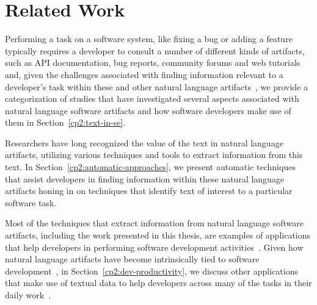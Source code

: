 \setcounter{chapter}{1}


\chapter{Related Work}
\label{ch:related-work}








Performing a task on a software system, like fixing a bug
or adding a feature typically requires a developer to consult
a number of different kinds of artifacts, such
as API documentation, bug reports, community forums
and web tutorials~\cite{umarji2008archetypal,Li2013}
and, given the challenges associated with finding
information relevant to a developer's task
within these and other natural language artifacts~\cite{Starke2009,DeGraaf2014},
we provide a categorization of studies that 
have 
investigated 
several aspects associated with natural language software artifacts
and how software developers make use of them in Section~\ref{cp2:text-in-se}.







Researchers have long recognized the value of the text in natural language
artifacts, utilizing various techniques and tools 
to extract information from this text. 
In Section~\ref{cp2:automatic-approaches}, 
we present automatic techniques that
assist developers in finding information within these natural language artifacts
honing in on techniques that identify text of interest 
to a particular software task.






Most of the techniques that extract information from natural language software artifacts, including the work presented in this thesis, 
are examples of applications that help developers in performing 
software development activities~\cite{Meyer2017}. 
Given how 
natural language artifacts have become intrinsically
tied to software development~\cite{liu2021, watson2022, umarji2008archetypal},
in Section~\ref{cp2:dev-productivity}, 
we discuss
other applications that make use of textual data
to help developers
across many of the tasks in their daily work~\cite{Treude2016,  robillard2017, silva2019}.












